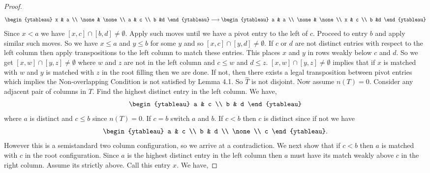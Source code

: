 \documentclass[11pt]{amsart}
\begin{document}
{\begin{proof}
\[\begin{ytableau}
x & a \\
\none & \none \\
a & c \\
b &d
\end{ytableau} \longrightarrow
\begin{ytableau}
a & a \\
\none & \none \\
x & c \\
b &d
\end{ytableau}
\]
Since $x<a$ we have $[x,c]\cap [b,d] \ne \emptyset$. Apply such moves until we have a pivot entry to the left of $c$. Proceed to entry $b$ and apply similar such moves. So we have $x \leq a$ and $y \leq b$ for some $y$ and so $[x,c] \cap [y,d] \ne \emptyset$. If $c$ or $d$ are not distinct entries with respect to the left column then apply transpositions to the left column to match these entries. This places $x$ and $y$ in rows weakly below $c$ and $d$. So we get $[x,w] \cap [y,z] \ne \emptyset$ where $w$ and $z$ are not in the left column and $c \leq w$ and $d \leq z$. 
\newline \indent $[x,w] \cap [y,z] \ne \emptyset$ implies that if $x$ is matched with $w$ and $y$ is matched with $z$ in the root filling then we are done. If not, then there exists a legal transposition between pivot entries which implies the Non-overlapping Condition is not satisfied by Lemma 4.1. So $\widehat{T}$ is not disjoint. 
\newline \indent Now assume $n(T)=0$. Consider any adjacent pair of columns in $T$. Find the highest distinct entry in the left column. We have,
\[
\begin{ytableau}
a & c \\
b & d
\end{ytableau}
\]
where $a$ is distinct and $c \leq b$ since $n(T)=0$. If $c=b$ switch $a$ and $b$. If $c<b$ then $c$ is distinct since if not we have 
\[
\begin{ytableau}
a & c \\
b & d \\
\none \\
c
\end{ytableau}.
\]
However this is a semistandard two column configuration, so we arrive at a contradiction. 
\newline\indent We next show that if $c<b$ then $a$ is matched with $c$ in the root configuration. Since $a$ is the highest distinct entry in the left column then $a$ must have its match weakly above $c$ in the right column. Assume its strictly above. Call this entry $x$. We have,

\end{proof}}
\end{document}
